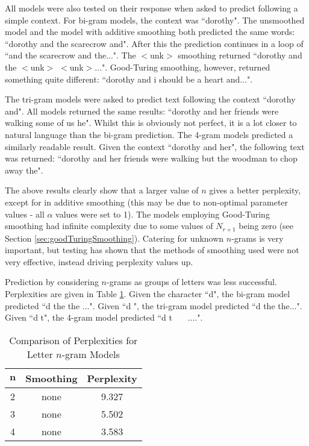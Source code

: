 All models were also tested on their response when asked to predict following a simple context. For bi-gram models, the context was ``dorothy". The unsmoothed model and the model with additive smoothing both predicted the same words: ``dorothy and the scarecrow and". After this the prediction continues in a loop of ``and the scarecrow and the...". The $<$unk$>$ smoothing returned ``dorothy and the $<$unk$>$ $<$unk$>$...". Good-Turing smoothing, however, returned something quite different: ``dorothy and i should be a heart and...". 

The tri-gram models were asked to predict text following the context ``dorothy and". All models returned the same results: ``dorothy and her friends were walking some of us he". Whilst this is obviously not perfect, it is a lot closer to natural language than the bi-gram prediction. The 4-gram models predicted a similarly readable result. Given the context ``dorothy and her", the following text was returned: ``dorothy and her friends were walking but the woodman to chop away the".

The above results clearly show that a larger value of $n$ gives a better perplexity, except for in additive smoothing (this may be due to non-optimal parameter values - all $\alpha$ values were set to 1). The models employing Good-Turing smoothing had infinite complexity due to some values of $N_{r+1}$ being zero (see Section \ref{sec:goodTuringSmoothing}). Catering for unknown $n$-grams is very important, but testing has shown that the methods of smoothing used were not very effective, instead driving perplexity values up. 

Prediction by considering $n$-grams as groups of letters was less successful. Perplexities are given in Table \ref{table:letterPerplexity}. Given the character ``d", the bi-gram model predicted ``d the the ...". Given ``d ", the tri-gram model predicted ``d the the...". Given ``d t", the 4-gram model predicted ``d t \ \ \ ....".

\begin{table}[h!]
\caption{Comparison of Perplexities for Letter $n$-gram Models}
\label{table:letterPerplexity}
\begin{center}
\begin{tabular}{|c|c|c|}
\hline
$\boldsymbol{n}$ & \textbf{Smoothing} & \textbf{Perplexity} \\ \hline
2 & none & 9.327 \\ \hline
3 & none & 5.502 \\ \hline
4 & none & 3.583 \\ \hline
\end{tabular}
\end{center}
\end{table}

